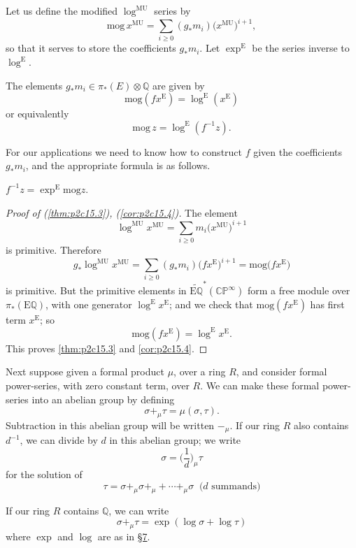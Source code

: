 \documentclass[../main]{subfiles}
\begin{document}
Let us define the modified $\log^{\mathrm{MU}}$ series by \[\mathrm{mog}\, x^{\mathrm{MU}}=\sum_{i\geq0}(g_\ast m_i)\big(x^{\mathrm{MU}}\big)^{i+1},\] so that it serves to store the coefficients $g_\ast m_i$. Let $\exp^{\mathrm{E}}$ be the series inverse to $\log^{\mathrm{E}}$.

\begin{proposition}
\label{thm:p2c15.3}
The elements $g_\ast m_i\in\pi_\ast(E)\otimes\mathbb{Q}$ are given by \[\mathrm{mog}(f x^{\mathrm E}) = \log^{\mathrm E} (x^{\mathrm E})\] or equivalently \[\mathrm{mog}\, z=\log^{\mathrm{E}}(f^{-1}z).\]
\end{proposition}
For our applications we need to know how to construct $f$ given the coefficients $g_\ast m_i$, and the appropriate formula is as follows.
\begin{corollary}
\label{cor:p2c15.4}
$f^{-1}z=\exp^{\mathrm{E}}\mathrm{mog}z.$
\end{corollary} 
\begin{proof}[Proof of (\ref{thm:p2c15.3}), (\ref{cor:p2c15.4})]
The element \[\log^{\mathrm{MU}}x^{\mathrm{MU}}=\sum_{i\geq0}m_i\big(x^{\mathrm{MU}}\big)^{i+1}\] is primitive. Therefore \[g_\ast \log^{\mathrm{MU}}x^{\mathrm{MU}}=\sum_{i\geq0}(g_\ast m_i)\big(fx^{\mathrm{E}}\big)^{i+1}=\mathrm{mog}\big(fx^{\mathrm{E}}\big)\] is primitive. But the primitive elements in $\tilde{\mathrm{E}\mathbb{Q}}^\ast(\mathbb{CP}^\infty)$ form a free module over $\pi_\ast(\mathrm{E}\mathbb{Q})$, with one generator $\log^{\mathrm{E}}x^{\mathrm{E}}$; and we check that $\mathrm{mog}(fx^{\mathrm{E}})$ has first term $x^{\mathrm{E}}$; so \[\mathrm{mog}(fx^{\mathrm{E}})=\log^{\mathrm{E}} x^{\mathrm{E}}.\] This proves \eqref{thm:p2c15.3} and \eqref{cor:p2c15.4}.
\end{proof}

Next suppose given a formal product $\mu$, over a ring $R$, and consider formal power-series, with zero constant term, over $R$. We can make these formal power-series into an abelian group by defining \[\sigma+_\mu\tau=\mu(\sigma,\tau).\] Subtraction in this abelian group will be written $-_\mu$. If our ring $R$ also contains $d^{-1}$, we can divide by $d$ in this abelian group; we write \[\sigma=\Big(\dfrac1d\Big)_\mu\tau\] for the solution of \[\tau=\sigma+_\mu\sigma+_\mu+\cdots+_\mu\sigma\:\text{ ($d$ summands)}\]

If our ring $R$ contains $\mathbb{Q}$, we can write \[\sigma+_\mu\tau=\exp(\log\sigma+\log\tau)\] where $\exp$ and $\log$ are as in \hyperref[sec:p2c7]{\S 7}.
\end{document}

